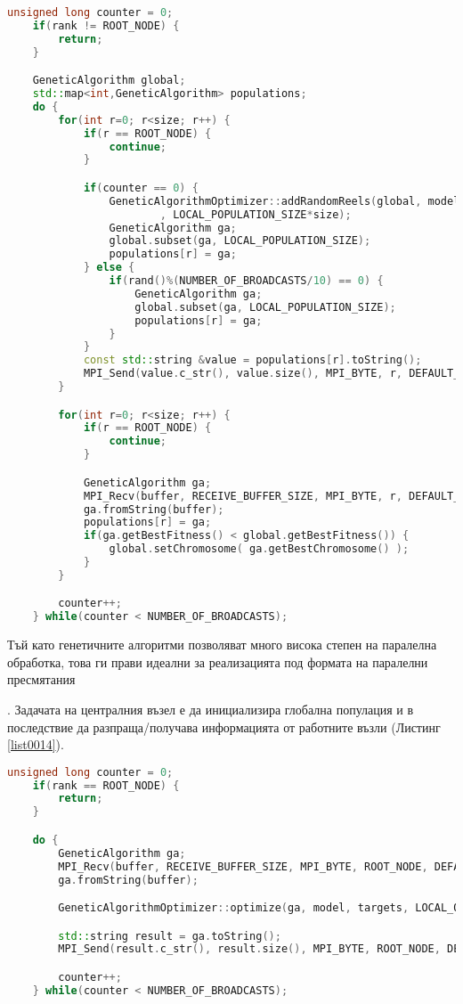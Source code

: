\begin{lstlisting}[caption=Алгоритъм на централния възел, language=C++, basicstyle=\tiny, label=list0014]
	unsigned long counter = 0;
	if(rank != ROOT_NODE) {
		return;
	}

	GeneticAlgorithm global;
	std::map<int,GeneticAlgorithm> populations;
	do {
		for(int r=0; r<size; r++) {
			if(r == ROOT_NODE) {
				continue;
			}

			if(counter == 0) {
				GeneticAlgorithmOptimizer::addRandomReels(global, model, targets
						, LOCAL_POPULATION_SIZE*size);
				GeneticAlgorithm ga;
				global.subset(ga, LOCAL_POPULATION_SIZE);
				populations[r] = ga;
			} else {
				if(rand()%(NUMBER_OF_BROADCASTS/10) == 0) {
					GeneticAlgorithm ga;
					global.subset(ga, LOCAL_POPULATION_SIZE);
					populations[r] = ga;
				}
			}
			const std::string &value = populations[r].toString();
			MPI_Send(value.c_str(), value.size(), MPI_BYTE, r, DEFAULT_TAG, MPI_COMM_WORLD);
		}

		for(int r=0; r<size; r++) {
			if(r == ROOT_NODE) {
				continue;
			}

			GeneticAlgorithm ga;
			MPI_Recv(buffer, RECEIVE_BUFFER_SIZE, MPI_BYTE, r, DEFAULT_TAG, MPI_COMM_WORLD, MPI_STATUS_IGNORE);
			ga.fromString(buffer);
			populations[r] = ga;
			if(ga.getBestFitness() < global.getBestFitness()) {
				global.setChromosome( ga.getBestChromosome() );
			}
		}

		counter++;
	} while(counter < NUMBER_OF_BROADCASTS);
\end{lstlisting}

Тъй като генетичните алгоритми позволяват много висока степен на паралелна обработка, това ги прави идеални за реализацията под формата на паралелни пресмятания\begin{comment}\cite{Balabanov-02}\end{comment}. Задачата на централния възел е да инициализира глобална популация и в последствие да разпраща/получава информацията от работните възли (Листинг \ref{list0014}). 

\begin{lstlisting}[caption=Алгоритъм на работните възли, language=C++, basicstyle=\tiny, label=list0015]
	unsigned long counter = 0;
	if(rank == ROOT_NODE) {
		return;
	}

	do {
		GeneticAlgorithm ga;
		MPI_Recv(buffer, RECEIVE_BUFFER_SIZE, MPI_BYTE, ROOT_NODE, DEFAULT_TAG, MPI_COMM_WORLD, MPI_STATUS_IGNORE);
		ga.fromString(buffer);

		GeneticAlgorithmOptimizer::optimize(ga, model, targets, LOCAL_OPTIMIZATION_EPOCHES);

		std::string result = ga.toString();
		MPI_Send(result.c_str(), result.size(), MPI_BYTE, ROOT_NODE, DEFAULT_TAG, MPI_COMM_WORLD);

		counter++;
	} while(counter < NUMBER_OF_BROADCASTS);
\end{lstlisting}


